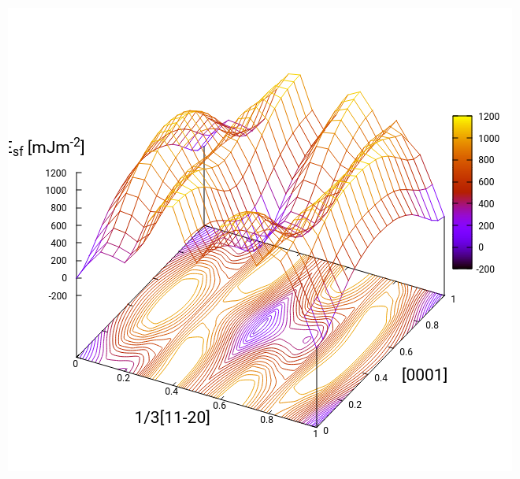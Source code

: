 \documentclass[11pt]{article}
\begin{document}
\begin{enumerate}
\begin{center}
\includegraphics[width=.9\linewidth]{Images/pyramidal_gs_noo_2019-11-08_alat.png}
\end{center}



\end{enumerate}
\end{document}
